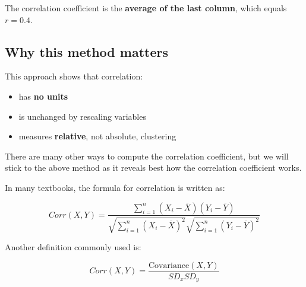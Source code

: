 \documentclass[
  letterpaper,
  DIV=11,
  numbers=noendperiod]{scrreprt}
\providecommand{\tightlist}{%
  \setlength{\itemsep}{0pt}\setlength{\parskip}{0pt}}
\begin{document}
The correlation coefficient is the \textbf{average of the last column},
which equals \(r = 0.4\).

\subsection{Why this method matters}\label{why-this-method-matters}

This approach shows that correlation:

\begin{itemize}
\tightlist
\item
  has \textbf{no units}
\item
  is unchanged by rescaling variables
\item
  measures \textbf{relative}, not absolute, clustering
\end{itemize}

There are many other ways to compute the correlation coefficient, but we
will stick to the above method as it reveals best how the correlation
coefficient works.

In many textbooks, the formula for correlation is written as:

\begin{tcolorbox}[enhanced jigsaw, coltitle=black, colbacktitle=quarto-callout-important-color!10!white, left=2mm, bottomrule=.15mm, bottomtitle=1mm, colback=white, titlerule=0mm, colframe=quarto-callout-important-color-frame, breakable, leftrule=.75mm, toptitle=1mm, opacitybacktitle=0.6, rightrule=.15mm, title=\textcolor{quarto-callout-important-color}{\faExclamation}\hspace{0.5em}{Correlation coefficient}, arc=.35mm, opacityback=0, toprule=.15mm]

\[
Corr(X,Y) = \frac{\sum_{i=1}^{n} (X_i - \overline{X})(Y_i - \overline{Y})}{\sqrt{\sum_{i=1}^{n} (X_i - \overline{X})^2} \sqrt{\sum_{i=1}^{n} (Y_i - \overline{Y})^2}}
\]

Another definition commonly used is:

\[
Corr(X,Y) = \displaystyle \frac{\text{Covariance}(X,Y)}{SD_x SD_y}
\]

\end{tcolorbox}
\end{document}
